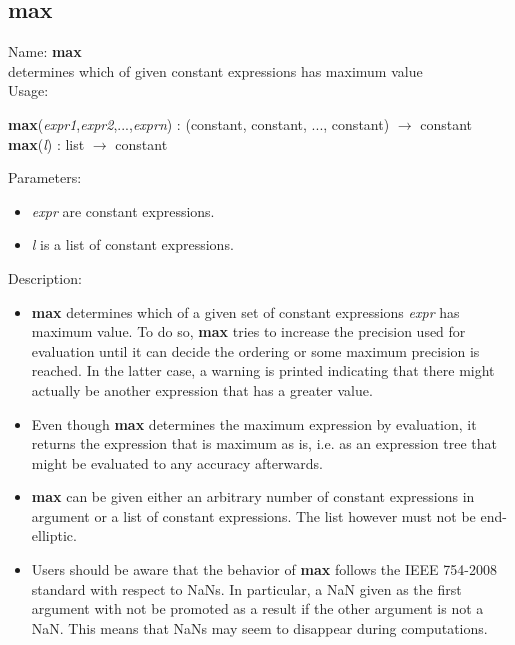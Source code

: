 \subsection{max}
\label{labmax}
\noindent Name: \textbf{max}\\
determines which of given constant expressions has maximum value\\
\noindent Usage: 
\begin{center}
\textbf{max}(\emph{expr1},\emph{expr2},...,\emph{exprn}) : (\textsf{constant}, \textsf{constant}, ..., \textsf{constant}) $\rightarrow$ \textsf{constant}\\
\textbf{max}(\emph{l}) : \textsf{list} $\rightarrow$ \textsf{constant}\\
\end{center}
Parameters: 
\begin{itemize}
\item \emph{expr} are constant expressions.
\item \emph{l} is a list of constant expressions.
\end{itemize}
\noindent Description: \begin{itemize}

\item \textbf{max} determines which of a given set of constant expressions
   \emph{expr} has maximum value. To do so, \textbf{max} tries to increase the
   precision used for evaluation until it can decide the ordering or some
   maximum precision is reached. In the latter case, a warning is printed
   indicating that there might actually be another expression that has a
   greater value.

\item Even though \textbf{max} determines the maximum expression by evaluation, it 
   returns the expression that is maximum as is, i.e. as an expression
   tree that might be evaluated to any accuracy afterwards.

\item \textbf{max} can be given either an arbitrary number of constant
   expressions in argument or a list of constant expressions. The list
   however must not be end-elliptic.

\item Users should be aware that the behavior of \textbf{max} follows the IEEE
   754-2008 standard with respect to NaNs. In particular, a NaN given as
   the first argument with not be promoted as a result if the other
   argument is not a NaN. This means that NaNs may seem to disappear
   during computations.
\end{itemize}
